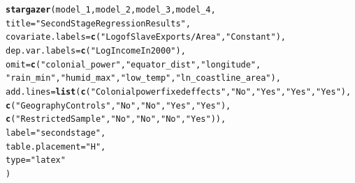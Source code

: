 \documentclass{article}\usepackage[]{graphicx}\usepackage[]{color}
\makeatletter
\newcommand{\hlstr}[1]{\textcolor[rgb]{0.192,0.494,0.8}{#1}}%
\newcommand{\hlstd}[1]{\textcolor[rgb]{0.345,0.345,0.345}{#1}}%
\newcommand{\hlkwc}[1]{\textcolor[rgb]{0.333,0.667,0.333}{#1}}%
\newcommand{\hlkwd}[1]{\textcolor[rgb]{0.737,0.353,0.396}{\textbf{#1}}}%
\newenvironment{kframe}{%
 \def\at@end@of@kframe{}%
 \ifinner\ifhmode%
  \def\at@end@of@kframe{\end{minipage}}%
  \begin{minipage}{\columnwidth}%
 \fi\fi%
 \def\FrameCommand##1{\hskip\@totalleftmargin \hskip-\fboxsep
 \colorbox{shadecolor}{##1}\hskip-\fboxsep
     \hskip-\linewidth \hskip-\@totalleftmargin \hskip\columnwidth}%
 \MakeFramed {\advance\hsize-\width
   \@totalleftmargin\z@ \linewidth\hsize
   \@setminipage}}%
 {\par\unskip\endMakeFramed%
 \at@end@of@kframe}
\makeatother
\begin{document}
\begin{kframe}
\begin{alltt}
\hlkwd{stargazer}\hlstd{(model_1,model_2, model_3,model_4,}
        \hlkwc{title} \hlstd{=} \hlstr{"Second Stage Regression Results"}\hlstd{,}
        \hlkwc{covariate.labels} \hlstd{=} \hlkwd{c}\hlstd{(}\hlstr{"Log of Slave Exports / Area"}\hlstd{,} \hlstr{"Constant"}\hlstd{),}
        \hlkwc{dep.var.labels} \hlstd{=} \hlkwd{c}\hlstd{(}\hlstr{"Log Income In 2000"}\hlstd{),}
        \hlkwc{omit} \hlstd{=} \hlkwd{c}\hlstd{(}\hlstr{"colonial_power"}\hlstd{,} \hlstr{"equator_dist"}\hlstd{,} \hlstr{"longitude"}\hlstd{,}
                 \hlstr{"rain_min"}\hlstd{,} \hlstr{"humid_max"}\hlstd{,} \hlstr{"low_temp"}\hlstd{,} \hlstr{"ln_coastline_area"}\hlstd{),}
        \hlkwc{add.lines} \hlstd{=} \hlkwd{list}\hlstd{(}\hlkwd{c}\hlstd{(}\hlstr{"Colonial power fixed effects"}\hlstd{,} \hlstr{"No"}\hlstd{,} \hlstr{"Yes"}\hlstd{,} \hlstr{"Yes"}\hlstd{,} \hlstr{"Yes"}\hlstd{),}
                  \hlkwd{c}\hlstd{(}\hlstr{"Geography Controls"}\hlstd{,} \hlstr{"No"}\hlstd{,} \hlstr{"No"}\hlstd{,} \hlstr{"Yes"}\hlstd{,}\hlstr{"Yes"}\hlstd{),}
                  \hlkwd{c}\hlstd{(}\hlstr{"Restricted Sample"}\hlstd{,} \hlstr{"No"}\hlstd{,} \hlstr{"No"}\hlstd{,} \hlstr{"No"}\hlstd{,}\hlstr{"Yes"}\hlstd{)),}
        \hlkwc{label}\hlstd{=}\hlstr{"secondstage"}\hlstd{,}
        \hlkwc{table.placement}\hlstd{=}\hlstr{"H"}\hlstd{,}
        \hlkwc{type}\hlstd{=}\hlstr{"latex"}
\hlstd{)}
\end{alltt}
\end{kframe}
\end{document}
